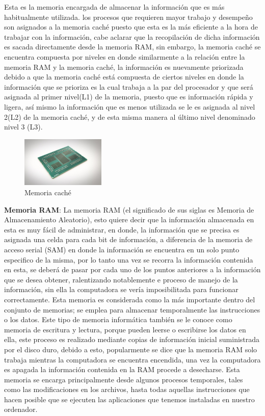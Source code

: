\documentclass[12pt]{article}
\begin{document}
\begin{itemize}
Esta es la memoria encargada de almacenar la información que es más habitualmente utilizada. los procesos que requieren mayor trabajo y desempeño son asignados a la memoria caché puesto que esta es la más eficiente a la hora de trabajar con la información, cabe aclarar que la recopilación de dicha información es sacada directamente desde la memoria RAM, sin embargo, la memoria caché se encuentra compuesta por niveles en donde similarmente a la relación entre la memoria RAM y la memoria caché, la información es nuevamente priorizada debido a que la memoria caché está compuesta de ciertos niveles en donde la información que se prioriza es la cual  trabaja a la par del procesador y que será asignada al primer nivel(L1) de la memoria, puesto que es información rápida y ligera, así mismo la información que es menos utilizada se le es asignada al nivel 2(L2) de la memoria caché, y de esta misma manera al último nivel denominado nivel 3 (L3).
\newline
\begin{figure}[h]
\includegraphics[width=4cm]{caché.jpg}
\centering
\caption{Memoria caché}
\label{fig:RAM}
\end{figure}
\vspace{15PT}
\newline
\textbf{Memoria RAM}: La memoria RAM (el significado de sus siglas es Memoria de Almacenamiento Aleatorio), esto quiere decir que la información almacenada en esta es muy fácil de administrar, en donde, la información que se precisa es asignada una celda para cada bit de información, a diferencia de la memoria de acceso serial (SAM) en donde la información se encuentra en un solo punto especifico de la misma, por lo tanto una vez se recorra la información contenida en esta, se deberá de pasar por cada uno de los puntos anteriores a la información que se desea obtener, ralentizando notablemente e proceso de manejo de la información, sin ella la computadora se vería imposibilitada para funcionar correctamente. Esta memoria es considerada como la más importante dentro del conjunto de memorias; se emplea para almacenar temporalmente las instrucciones o los datos. Este tipo de memoria informática también se le conoce como memoria de escritura y lectura, porque pueden leerse o escribirse los datos en ella, este proceso es realizado mediante copias de información inicial suministrada por el disco duro, debido a esto, popularmente se dice que la memoria RAM solo trabaja mientras la computadora se encuentra encendida, una vez la computadora es apagada la información contenida en la RAM procede a desecharse. Esta memoria se encarga principalmente desde algunos procesos temporales, tales como las modificaciones en los archivos, hasta todas aquellas instrucciones que hacen posible que se ejecuten las aplicaciones que tenemos instaladas en nuestro ordenador.


\end{itemize}
\end{document}
